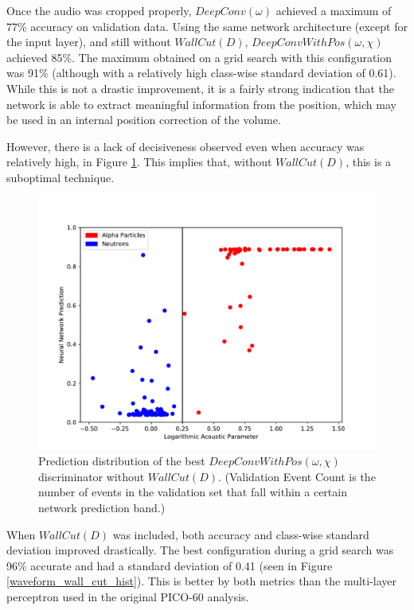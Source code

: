 \documentclass[10pt]{article}
\begin{document}
Once the audio was cropped properly, $DeepConv(\omega)$ achieved a maximum of 77\% accuracy on validation data. Using the same network architecture (except for the input layer), and still without $WallCut(D)$, $DeepConvWithPos(\omega, \chi)$ achieved 85\%. The maximum obtained on a grid search with this configuration was 91\% (although with a relatively high class-wise standard deviation of 0.61). While this is not a drastic improvement, it is a fairly strong indication that the network is able to extract meaningful information from the position, which may be used in an internal position correction of the volume.

However, there is a lack of decisiveness observed even when accuracy was relatively high, in Figure \ref{waveform_hist}. This implies that, without $WallCut(D)$, this is a suboptimal technique.

\begin{figure}[H]
    \centering
    \includegraphics[width=\textwidth]{waveform_hist}
    \caption{\label{waveform_hist} Prediction distribution of the best $DeepConvWithPos(\omega, \chi)$ discriminator without $WallCut(D)$. (Validation Event Count is the number of events in the validation set that fall within a certain network prediction band.)}
\end{figure}

When $WallCut(D)$ was included, both accuracy and class-wise standard deviation improved drastically. The best configuration during a grid search was 96\% accurate and had a standard deviation of 0.41 (seen in Figure \ref{waveform_wall_cut_hist}). This is better by both metrics than the multi-layer perceptron used in the original PICO-60 analysis.
\end{document}
